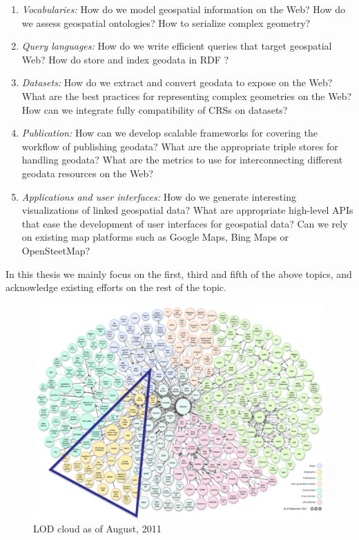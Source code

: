 \begin{enumerate}


\item \textit{Vocabularies:} How do we model geospatial information on the Web? How do we assess geospatial ontologies? How to serialize complex geometry? 
\item \textit{Query languages:} How do we write efficient queries that target geospatial Web? How do store and index geodata in RDF ?
\item \textit{Datasets:} How do we extract and convert geodata to expose on the Web? What are the best practices for representing complex geometries on the Web? How can we integrate fully compatibility of CRSs on datasets? 
\item \textit{Publication:} How can we develop scalable frameworks for covering the workflow of publishing geodata? What are the appropriate triple stores for handling geodata? What are the metrics to use for interconnecting different geodata resources on the Web?  
\item \textit{Applications and user interfaces:} How do we generate interesting visualizations of linked geospatial data? What are appropriate high-level APIs that ease the development of user interfaces for geospatial data? Can we rely on existing map platforms such as Google Maps, Bing Maps or OpenSteetMap?
\end{enumerate}

In this thesis we mainly focus on the first, third and fifth of the above topics, and acknowledge existing efforts on the rest of the topic. 

\begin{figure}[ht!]
\includegraphics[scale=0.9]{img/lod-diagram-2011.png}
\caption{LOD cloud as of August, 2011}
\label{fig:lodcloud2011}
\end{figure}

